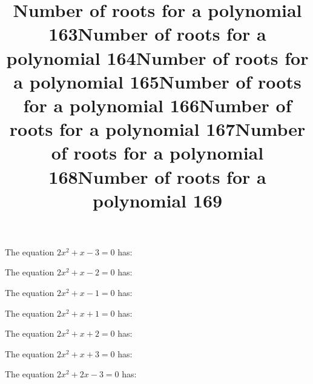 \documentclass{article}
\begin{document}
\begin{category}
\begin{question}[multichoice]
\end{question}
\begin{question}[multichoice]
\title{Number of roots for a polynomial 163}
The equation $2 x^{2} + x - 3=0$ has:


\end{question}
\begin{question}[multichoice]
\title{Number of roots for a polynomial 164}
The equation $2 x^{2} + x - 2=0$ has:


\end{question}
\begin{question}[multichoice]
\title{Number of roots for a polynomial 165}
The equation $2 x^{2} + x - 1=0$ has:


\end{question}
\begin{question}[multichoice]
\title{Number of roots for a polynomial 166}
The equation $2 x^{2} + x + 1=0$ has:


\end{question}
\begin{question}[multichoice]
\title{Number of roots for a polynomial 167}
The equation $2 x^{2} + x + 2=0$ has:


\end{question}
\begin{question}[multichoice]
\title{Number of roots for a polynomial 168}
The equation $2 x^{2} + x + 3=0$ has:


\end{question}
\begin{question}[multichoice]
\title{Number of roots for a polynomial 169}
The equation $2 x^{2} + 2 x - 3=0$ has:


\end{question}
\end{category}
\end{document}

